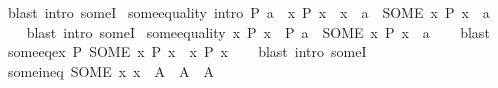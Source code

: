 \begin{isabellebody}
%
\isatagproof
{}\isamarkupfalse%
\ {\isacharparenleft}{\kern0pt}blast\ intro{\isacharcolon}{\kern0pt}\ someI{}{\isacharparenright}{\kern0pt}%
\endisatagproof
{\isafoldproof}%
%
\isadelimproof
\isanewline
%
\endisadelimproof
\isanewline
{}\isamarkupfalse%
\ some{\isacharunderscore}{\kern0pt}equality\ {\isacharbrackleft}{\kern0pt}intro{\isacharbrackright}{\kern0pt}{\isacharcolon}{\kern0pt}\ {\isachardoublequoteopen}P\ a\ {\isasymLongrightarrow}\ {\isacharparenleft}{\kern0pt}{\isasymAnd}x{\isachardot}{\kern0pt}\ P\ x\ {\isasymLongrightarrow}\ x\ {\isacharequal}{\kern0pt}\ a{\isacharparenright}{\kern0pt}\ {\isasymLongrightarrow}\ {\isacharparenleft}{\kern0pt}SOME\ x{\isachardot}{\kern0pt}\ P\ x{\isacharparenright}{\kern0pt}\ {\isacharequal}{\kern0pt}\ a{\isachardoublequoteclose}\isanewline
%
\isadelimproof
\ \ %
\endisadelimproof
%
\isatagproof
{}\isamarkupfalse%
\ {\isacharparenleft}{\kern0pt}blast\ intro{\isacharcolon}{\kern0pt}\ someI{}{\isacharparenright}{\kern0pt}%
\endisatagproof
{\isafoldproof}%
%
\isadelimproof
\isanewline
%
\endisadelimproof
\isanewline
{}\isamarkupfalse%
\ some{}{\isacharunderscore}{\kern0pt}equality{\isacharcolon}{\kern0pt}\ {\isachardoublequoteopen}{\isasymexists}{\isacharbang}{\kern0pt}x{\isachardot}{\kern0pt}\ P\ x\ {\isasymLongrightarrow}\ P\ a\ {\isasymLongrightarrow}\ {\isacharparenleft}{\kern0pt}SOME\ x{\isachardot}{\kern0pt}\ P\ x{\isacharparenright}{\kern0pt}\ {\isacharequal}{\kern0pt}\ a{\isachardoublequoteclose}\isanewline
%
\isadelimproof
\ \ %
\endisadelimproof
%
\isatagproof
{}\isamarkupfalse%
\ blast%
\endisatagproof
{\isafoldproof}%
%
\isadelimproof
\isanewline
%
\endisadelimproof
\isanewline
{}\isamarkupfalse%
\ some{\isacharunderscore}{\kern0pt}eq{\isacharunderscore}{\kern0pt}ex{\isacharcolon}{\kern0pt}\ {\isachardoublequoteopen}P\ {\isacharparenleft}{\kern0pt}SOME\ x{\isachardot}{\kern0pt}\ P\ x{\isacharparenright}{\kern0pt}\ {\isasymlongleftrightarrow}\ {\isacharparenleft}{\kern0pt}{\isasymexists}x{\isachardot}{\kern0pt}\ P\ x{\isacharparenright}{\kern0pt}{\isachardoublequoteclose}\isanewline
%
\isadelimproof
\ \ %
\endisadelimproof
%
\isatagproof
{}\isamarkupfalse%
\ {\isacharparenleft}{\kern0pt}blast\ intro{\isacharcolon}{\kern0pt}\ someI{\isacharparenright}{\kern0pt}%
\endisatagproof
{\isafoldproof}%
%
\isadelimproof
\isanewline
%
\endisadelimproof
\isanewline
{}\isamarkupfalse%
\ some{\isacharunderscore}{\kern0pt}in{\isacharunderscore}{\kern0pt}eq{\isacharcolon}{\kern0pt}\ {\isachardoublequoteopen}{\isacharparenleft}{\kern0pt}SOME\ x{\isachardot}{\kern0pt}\ x\ {\isasymin}\ A{\isacharparenright}{\kern0pt}\ {\isasymin}\ A\ {\isasymlongleftrightarrow}\ A\ {\isasymnoteq}\ {\isacharbraceleft}{\kern0pt}{\isacharbraceright}{\kern0pt}{\isachardoublequoteclose}\isanewline

\end{isabellebody}
